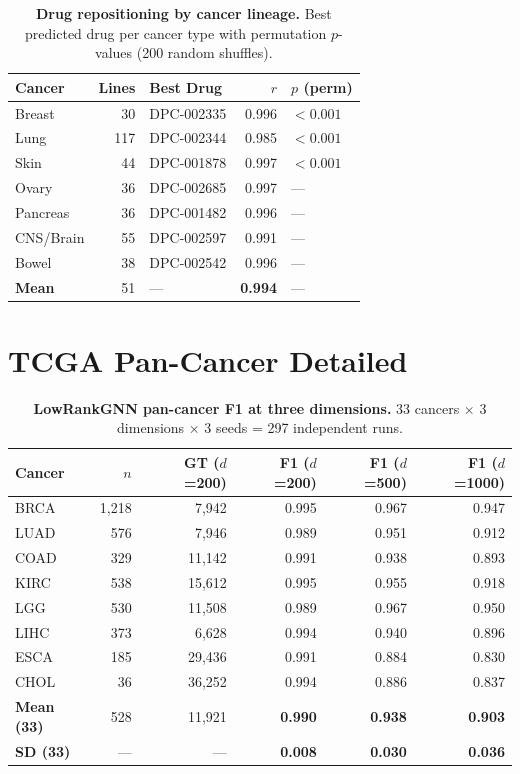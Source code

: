 \documentclass{article}
\theoremstyle{definition}
\begin{document}
\begin{table}[H]
\centering
\caption{\textbf{Drug repositioning by cancer lineage.} Best predicted drug per cancer type with permutation $p$-values (200 random shuffles).}
\label{tab:cancer_drug}
\small
\begin{tabular}{lrlrl}
\toprule
Cancer & Lines & Best Drug & $r$ & $p$ (perm) \\
\midrule
Breast & 30 & DPC-002335 & 0.996 & $<0.001$ \\
Lung & 117 & DPC-002344 & 0.985 & $<0.001$ \\
Skin & 44 & DPC-001878 & 0.997 & $<0.001$ \\
Ovary & 36 & DPC-002685 & 0.997 & --- \\
Pancreas & 36 & DPC-001482 & 0.996 & --- \\
CNS/Brain & 55 & DPC-002597 & 0.991 & --- \\
Bowel & 38 & DPC-002542 & 0.996 & --- \\
\midrule
\textbf{Mean} & 51 & --- & \textbf{0.994} & --- \\
\bottomrule
\end{tabular}
\end{table}

\section{TCGA Pan-Cancer Detailed}

\begin{table}[H]
\centering
\caption{\textbf{LowRankGNN pan-cancer F1 at three dimensions.} 33 cancers $\times$ 3 dimensions $\times$ 3 seeds = 297 independent runs.}
\label{tab:tcga_detail}
\small
\begin{tabular}{lrrrrr}
\toprule
Cancer & $n$ & GT ($d$=200) & F1 ($d$=200) & F1 ($d$=500) & F1 ($d$=1000) \\
\midrule
BRCA & 1,218 & 7,942 & 0.995 & 0.967 & 0.947 \\
LUAD & 576 & 7,946 & 0.989 & 0.951 & 0.912 \\
COAD & 329 & 11,142 & 0.991 & 0.938 & 0.893 \\
KIRC & 538 & 15,612 & 0.995 & 0.955 & 0.918 \\
LGG & 530 & 11,508 & 0.989 & 0.967 & 0.950 \\
LIHC & 373 & 6,628 & 0.994 & 0.940 & 0.896 \\
ESCA & 185 & 29,436 & 0.991 & 0.884 & 0.830 \\
CHOL & 36 & 36,252 & 0.994 & 0.886 & 0.837 \\
\midrule
\textbf{Mean (33)} & 528 & 11,921 & \textbf{0.990} & \textbf{0.938} & \textbf{0.903} \\
\textbf{SD (33)} & --- & --- & \textbf{0.008} & \textbf{0.030} & \textbf{0.036} \\
\bottomrule
\end{tabular}
\end{table}
\end{document}
